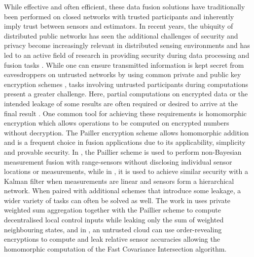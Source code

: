 \documentclass[letterpaper, 10 pt, conference]{ieeeconf}
\begin{document}
While effective and often efficient, these data fusion solutions have traditionally been performed on closed networks with trusted participants and inherently imply trust between sensors and estimators. In recent years, the ubiquity of distributed public networks has seen the additional challenges of security and privacy become increasingly relevant in distributed sensing environments and has led to an active field of research in providing security during data processing and fusion tasks \cite{renSecurityChallengesPublic2012,brennerSecretProgramExecution2011}. While one can ensure transmitted information is kept secret from eavesdroppers on untrusted networks by using common private and public key encryption schemes \cite{katzIntroductionModernCryptography2008}, tasks involving untrusted participants during computations present a greater challenge. Here, partial computations on encrypted data or the intended leakage of some results are often required or desired to arrive at the final result \cite{risticSecureFastCovariance2021,shiPrivacyPreservingAggregationTimeSeries2011,risticCryptographicallyPrivilegedState2022}. One common tool for achieving these requirements is homomorphic encryption \cite{gentryFullyHomomorphicEncryption2009,paillierPublicKeyCryptosystemsBased1999} which allows operations to be computed on encrypted numbers without decryption. The Pailler encryption scheme \cite{paillierPublicKeyCryptosystemsBased1999} allows homomorphic addition and is a frequent choice in fusion applications due to its applicability, simplicity and provable security. In \cite{alanwarPrOLocResilientLocalization2017}, the Paillier scheme is used to perform non-Bayesian measurement fusion with range-sensors without disclosing individual sensor locations or measurements, while in \cite{aristovEncryptedMultisensorInformation2018}, it is used to achieve similar security with a Kalman filter when measurements are linear and sensors form a hierarchical network. When paired with additional schemes that introduce some leakage, a wider variety of tasks can often be solved as well. The work in \cite{alexandruEncryptedCooperativeControl2019} uses private weighted sum aggregation together with the Paillier scheme to compute decentralised local control inputs while leaking only the sum of weighted neighbouring states, and in \cite{risticSecureFastCovariance2021}, an untrusted cloud can use order-revealing encryptions to compute and leak relative sensor accuracies allowing the homomorphic computation of the Fast Covariance Intersection algorithm.
\end{document}
